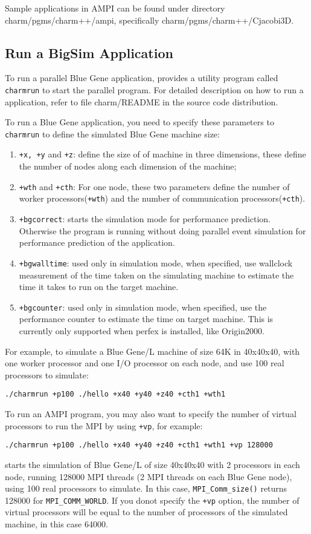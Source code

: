 Sample applications in AMPI can be found under directory
charm/pgms/charm++/ampi, specifically charm/pgms/charm++/Cjacobi3D.

\subsection{Run a BigSim Application}

To run a parallel Blue Gene application, \charmpp{} provides a utility program
called {\tt charmrun} to start the parallel program. 
For detailed description on how to run a \charmpp{} application, 
refer to file charm/README in the source code distribution.

To run a Blue Gene application, you need to specify these parameters to 
{\tt charmrun} to define the simulated Blue Gene machine size:
\begin{enumerate}
\item {\tt +x, +y} and {\tt +z}:  define the size of of machine in three dimensions, these define the number of nodes along each dimension of the machine;
\item {\tt +wth} and {\tt +cth}:  For one node, these two parameters define the number of worker processors({\tt +wth}) and the number of communication processors({\tt +cth}).
\item {\tt +bgcorrect}: starts the simulation mode for performance prediction. Otherwise the program is running without doing parallel event simulation for performance prediction of the application.
\item {\tt +bgwalltime}: used only in simulation mode, when specified, use wallclock measurement of the time taken on the simulating machine to estimate the time it takes to run on the target machine.
\item {\tt +bgcounter}:  used only in simulation mode, when specified, use the performance counter to estimate the time on target machine. This is currently only supported when perfex is installed, like Origin2000.
\end{enumerate}

For example, to simulate a Blue Gene/L machine of size 64K in 40x40x40, with 
one worker processor and one I/O processor on each node, and use 100 
real processors to simulate:
\begin{verbatim}
./charmrun +p100 ./hello +x40 +y40 +z40 +cth1 +wth1
\end{verbatim}

To run an AMPI program, you may also want to specify the number of virtual 
processors to run the MPI by using {\tt +vp}, for example:
\begin{verbatim}
./charmrun +p100 ./hello +x40 +y40 +z40 +cth1 +wth1 +vp 128000
\end{verbatim}
starts the simulation of Blue Gene/L of size 40x40x40 with 2 processors 
in each node, running 128000 MPI threads (2 MPI threads on each Blue Gene node),
 using 100 real processors to simulate. In this case, {\tt MPI\_Comm\_size()}
returns 128000 for {\tt MPI\_COMM\_WORLD}. If you donot specify the {\tt +vp}
option, the number of virtual processors will be equal to the number of 
processors of the simulated machine, in this case 64000.


